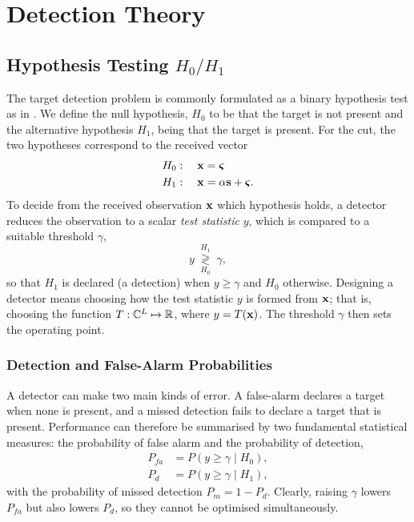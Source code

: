 \documentclass[12pt, a4paper]{report}
\begin{document}
\clearpage
\section{Detection Theory}
\label{sec:detection_theory}
\subsection{Hypothesis Testing $H_0/H_1$}
The target detection problem is commonly formulated as a binary hypothesis test as in \cite{Aboutanios2020}. We define the null hypothesis, $H_0$ to be that the target is not present and the alternative hypothesis $H_1$, being that the target is present. For the \gls{cut}, the two hypotheses correspond to the received vector
\begin{align}
    H_0:\quad \vb x&=\boldsymbol{\varsigma}\nonumber\\
    H_1:\quad \vb x&=\alpha\vb s + \boldsymbol{\varsigma}.\nonumber
\end{align}
To decide from the received observation $\vb x$ which hypothesis holds, a detector reduces the observation to a scalar \emph{test statistic} $y$, which is compared to a suitable threshold $\gamma$,
$$y\;\underset{H_0}{\overset{H_1}{\gtrless}}\; \gamma,$$
so that $H_1$ is declared (a detection) when $y\geq\gamma$ and $H_0$ otherwise. Designing a detector means choosing how the test statistic $y$ is formed from $\vb x$; that is, choosing the function $T:\mathbb{C}^{L}\mapsto \mathbb{R}$, where $y=T(\vb x)$. The threshold $\gamma$ then sets the operating point.\\

\subsubsection{Detection and False-Alarm Probabilities}
A detector can make two main kinds of error. A false-alarm declares a target when none is present, and a missed detection fails to declare a target that is present. Performance can therefore be summarised by two fundamental statistical measures: the probability of false alarm and the probability of detection,
\begin{align}
    P_{fa} &= P(y\ge\gamma\mid H_0), \nonumber\\
    P_{d}  &= P(y\ge\gamma\mid H_1), \nonumber
\end{align}
with the probability of missed detection $P_m=1-P_d$. Clearly, raising $\gamma$ lowers $P_{fa}$ but also lowers $P_d$, so they cannot be optimised simultaneously.\\
\end{document}
